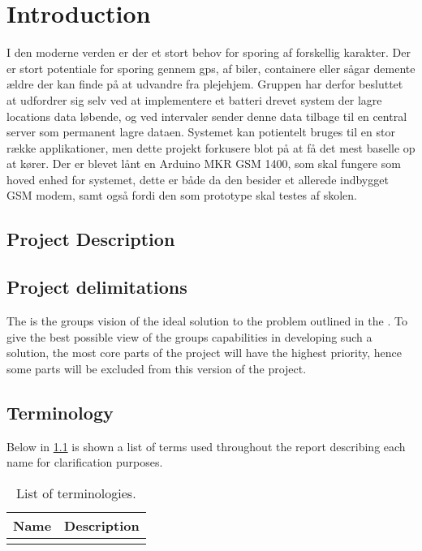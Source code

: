 
\chapter{Introduction}
\label{sec:introduction}
I den moderne verden er der et stort behov for sporing af forskellig karakter. Der er stort potentiale for sporing gennem gps, af biler, containere eller sågar demente ældre der kan finde på at udvandre fra plejehjem. 
Gruppen har derfor besluttet at udfordrer sig selv ved at implementere et batteri drevet system der lagre locations data løbende, og ved intervaler sender denne data tilbage til en central server som permanent lagre dataen. Systemet kan potientelt bruges til en stor række applikationer, men dette projekt forkusere blot på at få det mest baselle op at kører.
Der er blevet lånt en Arduino MKR GSM 1400, som skal fungere som hoved enhed for systemet, dette er både da den besider et allerede indbygget GSM modem, samt også fordi den som prototype skal testes af skolen. 

\section{Project Description}
\label{sec:projectDescription}


\section{Project delimitations}
\label{sec:delimitations}
The  is the groups vision of the ideal solution to the problem outlined in the .  
To give the best possible view of the groups capabilities in developing such a solution, the most core parts of the project will have the highest priority, hence some parts will be excluded from this version of the project. 

\section{Terminology}
\label{sec:terminology}
Below in \cref{tab:terminology} is shown a list of terms used throughout the report describing each name for clarification purposes.

\begin{table}[H]
	\centering
	\begin{tabularx}{0.8\textwidth}{l X}
		\toprule
		\textbf{Name} & \textbf{Description} \\
		\midrule
		&\\
		\bottomrule
	\end{tabularx}
	\caption{List of terminologies.}
	\label{tab:terminology}
\end{table}